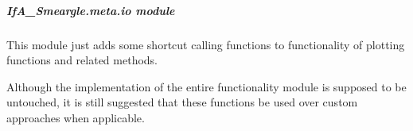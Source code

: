 \documentclass[letterpaper,10pt,english]{sphinxmanual}
\begin{document}
\subparagraph{IfA\_Smeargle.meta.io module}
\label{\detokenize{python_docstrings/IfA_Smeargle.meta.io:module-IfA_Smeargle.meta.io}}\label{\detokenize{python_docstrings/IfA_Smeargle.meta.io:ifa-smeargle-meta-io-module}}\label{\detokenize{python_docstrings/IfA_Smeargle.meta.io::doc}}
This module just adds some shortcut calling functions to functionality of plotting functions
and related methods.

Although the implementation of the entire functionality module is supposed to be untouched,
it is still suggested that these functions be used over custom approaches when applicable.
\end{document}
